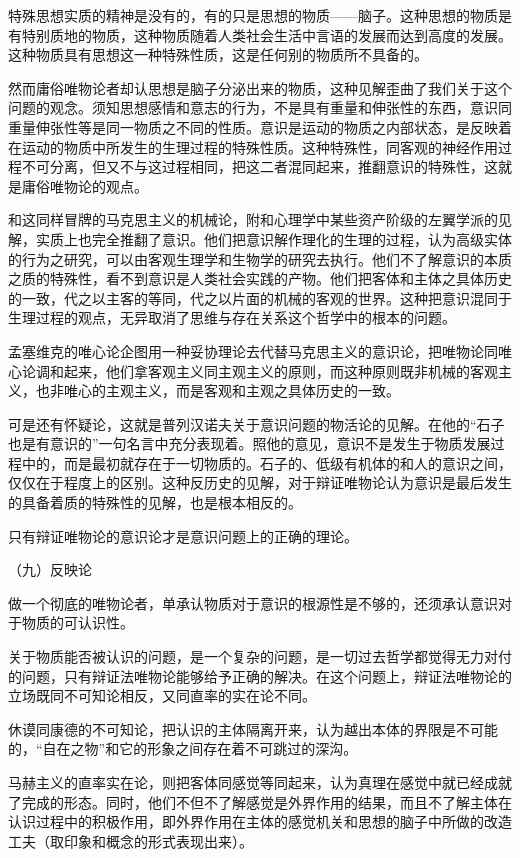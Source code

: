 \documentclass[UTF8, 12pt, a4paper]{ctexrep}
\begin{document}
特殊思想实质的精神是没有的，有的只是思想的物质——脑子。这种思想的物质是有特别质地的物质，这种物质随着人类社会生活中言语的发展而达到高度的发展。这种物质具有思想这一种特殊性质，这是任何别的物质所不具备的。

然而庸俗唯物论者却认思想是脑子分泌出来的物质，这种见解歪曲了我们关于这个问题的观念。须知思想感情和意志的行为，不是具有重量和伸张性的东西，意识同重量伸张性等是同一物质之不同的性质。意识是运动的物质之内部状态，是反映着在运动的物质中所发生的生理过程的特殊性质。这种特殊性，同客观的神经作用过程不可分离，但又不与这过程相同，把这二者混同起来，推翻意识的特殊性，这就是庸俗唯物论的观点。

和这同样冒牌的马克思主义的机械论，附和心理学中某些资产阶级的左翼学派的见解，实质上也完全推翻了意识。他们把意识解作理化的生理的过程，认为高级实体的行为之研究，可以由客观生理学和生物学的研究去执行。他们不了解意识的本质之质的特殊性，看不到意识是人类社会实践的产物。他们把客体和主体之具体历史的一致，代之以主客的等同，代之以片面的机械的客观的世界。这种把意识混同于生理过程的观点，无异取消了思维与存在关系这个哲学中的根本的问题。

孟塞维克的唯心论企图用一种妥协理论去代替马克思主义的意识论，把唯物论同唯心论调和起来，他们拿客观主义同主观主义的原则，而这种原则既非机械的客观主义，也非唯心的主观主义，而是客观和主观之具体历史的一致。

可是还有怀疑论，这就是普列汉诺夫关于意识问题的物活论的见解。在他的“石子也是有意识的”一句名言中充分表现着。照他的意见，意识不是发生于物质发展过程中的，而是最初就存在于一切物质的。石子的、低级有机体的和人的意识之间，仅仅在于程度上的区别。这种反历史的见解，对于辩证唯物论认为意识是最后发生的具备着质的特殊性的见解，也是根本相反的。

只有辩证唯物论的意识论才是意识问题上的正确的理论。

（九）反映论

做一个彻底的唯物论者，单承认物质对于意识的根源性是不够的，还须承认意识对于物质的可认识性。

关于物质能否被认识的问题，是一个复杂的问题，是一切过去哲学都觉得无力对付的问题，只有辩证法唯物论能够给予正确的解决。在这个问题上，辩证法唯物论的立场既同不可知论相反，又同直率的实在论不同。

休谟同康德的不可知论，把认识的主体隔离开来，认为越出本体的界限是不可能的，“自在之物”和它的形象之间存在着不可跳过的深沟。

马赫主义的直率实在论，则把客体同感觉等同起来，认为真理在感觉中就已经成就了完成的形态。同时，他们不但不了解感觉是外界作用的结果，而且不了解主体在认识过程中的积极作用，即外界作用在主体的感觉机关和思想的脑子中所做的改造工夫（取印象和概念的形式表现出来）。
\end{document}
